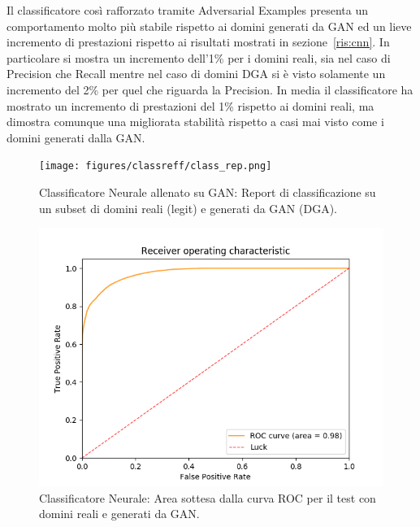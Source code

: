 Il classificatore così rafforzato tramite Adversarial Examples presenta un comportamento molto più stabile rispetto ai domini generati da GAN ed un  lieve incremento di prestazioni rispetto ai risultati mostrati in sezione~\ref{ris:cnn}. In particolare si mostra un incremento dell'1\% per i domini reali, sia nel caso di Precision che Recall mentre nel caso di domini DGA si è visto solamente un incremento del 2\% per quel che riguarda la Precision. In media il classificatore ha mostrato un incremento di prestazioni del 1\% rispetto ai domini reali, ma dimostra comunque una migliorata stabilità rispetto a casi mai visto come i domini generati dalla GAN.

\begin{figure}[!bp]
    \centering
    \texttt{[image: figures/classreff/class\_rep.png]}
    \caption{Classificatore Neurale allenato su GAN: Report di classificazione su un subset di domini reali (legit) e generati da GAN (DGA).\label{fig:repnngan}}
\end{figure}

\begin{figure}[!bp]
    \centering
    \includegraphics[width=\columnwidth]{figures/classreff/roc_plot.png}
    \caption{Classificatore Neurale: Area sottesa dalla curva ROC per il test con domini reali e generati da GAN.\label{fig:rocnngan}}
\end{figure}

\newpage
